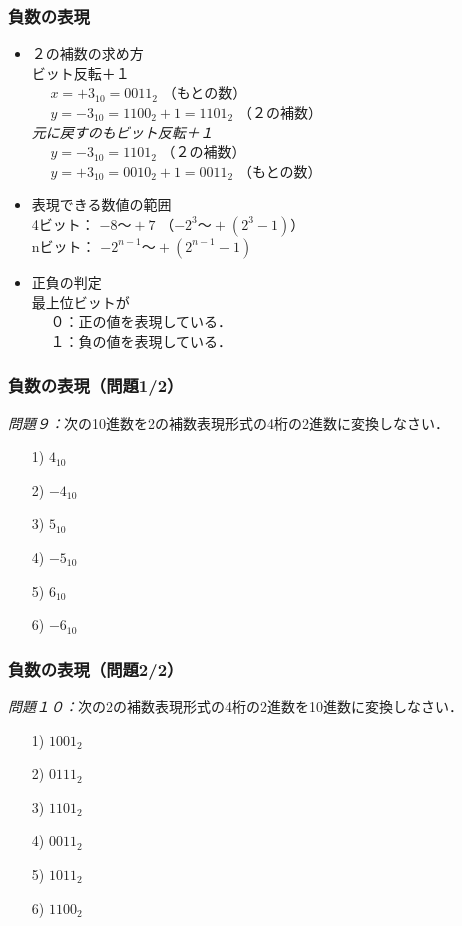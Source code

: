 \documentclass[handout]{beamer}        %
\begin{document}
\begin{frame}
  \frametitle{負数の表現}
  \begin{itemize}
  \item ２の補数の求め方 \\
    ビット反転＋１\\
    ~~ $x = +3_{10} = 0011_2$ （もとの数）\\
    ~~ $y = -3_{10} = 1100_2 + 1 = 1101_2$ （２の補数）\\
    \emph{元に戻すのもビット反転＋１}\\
    ~~ $y = -3_{10} = 1101_2$ （２の補数）\\
    ~~ $y = +3_{10} = 0010_2 + 1 = 0011_2$ （もとの数）\\
    \vfill
  \item 表現できる数値の範囲 \\
    4ビット： $-8 〜 +7$ （$-2^3〜+(2^3-1)$） \\
    nビット： $-2^{n-1} 〜 +(2^{n-1} - 1)$
    \vfill
  \item 正負の判定 \\
    最上位ビットが \\
    ~~ ０：正の値を表現している．\\
    ~~ １：負の値を表現している．
  \end{itemize}
\end{frame}

\begin{frame}
  \frametitle{負数の表現（問題1/2）}
\emph{問題９：}次の10進数を2の補数表現形式の4桁の2進数に変換しなさい．
\begin{enumerate}
\item[1)] $4_{10}$
\vfill
\item[2)] $-4_{10}$
\vfill
\item[3)] $5_{10}$
\vfill
\item[4)] $-5_{10}$
\vfill
\item[5)] $6_{10}$
\vfill
\item[6)] $-6_{10}$
\vfill
\end{enumerate}
\end{frame}

\begin{frame}
  \frametitle{負数の表現（問題2/2）}
\emph{問題１０：}次の2の補数表現形式の4桁の2進数を10進数に変換しなさい．
\begin{enumerate}
\item[1)] $1001_2$
\vfill
\item[2)] $0111_2$
\vfill
\item[3)] $1101_2$
\vfill
\item[4)] $0011_2$
\vfill
\item[5)] $1011_2$
\vfill
\item[6)] $1100_2$
\vfill
\end{enumerate}
\end{frame}
\end{document}
